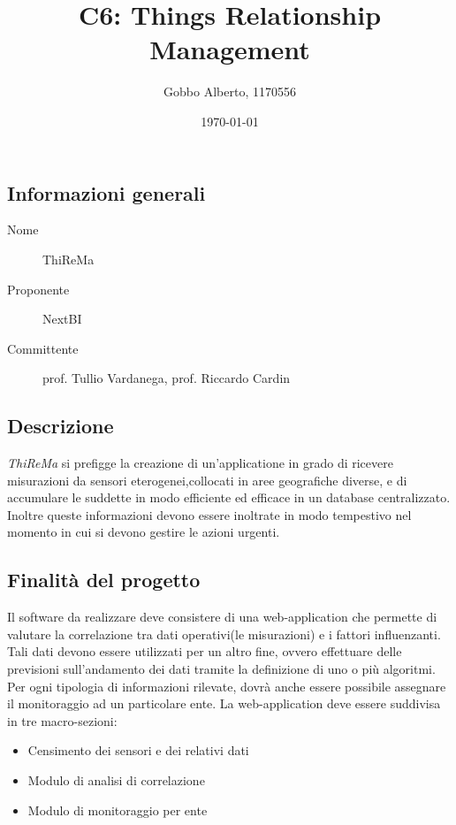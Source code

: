 \documentclass[../studio-di-fattibilita.tex]{subfiles}
\title{C6: Things Relationship Management}
\author{Gobbo Alberto, 1170556}
\date{\today}
\begin{document}
	\subsection{Informazioni generali}
	\label{sec:informazioni_generali}
	\begin{description}
		\item[Nome] ThiReMa
		\item[Proponente] NextBI
		\item[Committente] prof. Tullio Vardanega, prof. Riccardo Cardin
	\end{description}
	\subsection{Descrizione}
	\label{sec:descrizione}
	\textit{ThiReMa} si prefigge la creazione di un'applicatione in grado di ricevere misurazioni da sensori eterogenei,collocati in aree geografiche diverse, e di accumulare le suddette in modo efficiente ed efficace in un database centralizzato. Inoltre queste informazioni devono essere inoltrate in modo tempestivo nel momento in cui si devono gestire le azioni urgenti.
	\subsection{Finalità del progetto}
	\label{sec:finalità_del_progetto}
	Il software da realizzare deve consistere di una web-application che permette di valutare la correlazione tra dati operativi(le misurazioni) e i fattori influenzanti. Tali dati devono essere utilizzati per un altro fine, ovvero effettuare delle previsioni sull'andamento dei dati tramite la definizione di uno o più algoritmi.
	Per ogni tipologia di informazioni rilevate, dovrà anche essere possibile assegnare il monitoraggio ad un particolare ente.
	La web-application deve essere suddivisa in tre macro-sezioni:
	\begin{itemize}
		\item Censimento dei sensori e dei relativi dati
		\item Modulo di analisi di correlazione
		\item Modulo di monitoraggio per ente
	\end{itemize}
\end{document}
